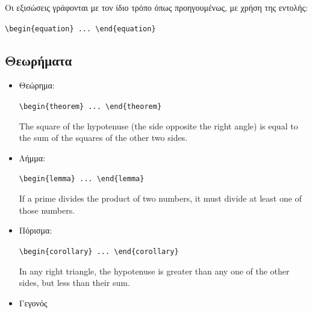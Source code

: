 Οι εξισώσεις γράφονται με τον ίδιο τρόπο όπως προηγουμένως, με
χρήση της εντολής:

\begin{center}\verb"\begin{equation} ... \end{equation}"\end{center}

\subsection{Θεωρήματα}
\label{subsec:Theorems}

\begin{itemize}
	\item Θεώρημα:

	\begin{center}\verb"\begin{theorem} ... \end{theorem}"\end{center}

	\begin{theorem}
	Τhe square of the hypotenuse (the side opposite the right angle)
	is equal to the sum of the squares of the other two sides.
	\end{theorem}

	\item Λήμμα:

	\begin{center}\verb"\begin{lemma} ... \end{lemma}"\end{center}

	\begin{lemma}
	If a prime divides the product of two numbers, it must divide at least
	one of those numbers.
	\end{lemma}
	
	\item Πόρισμα:

	\begin{center}\verb"\begin{corollary} ... \end{corollary}"\end{center}
	
	\begin{corollary}
	In any right triangle, the hypotenuse is greater than any one of the
	other sides, but less than their sum.
	\end{corollary}
	
	\item Γεγονός
	

\end{itemize}
